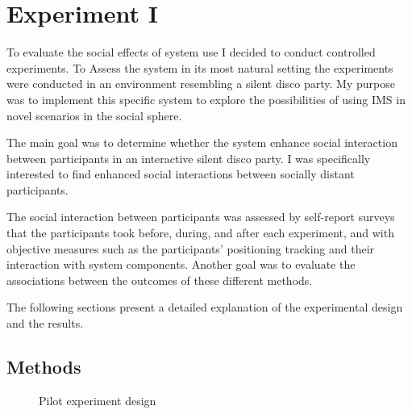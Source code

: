 \documentclass[a4paper,11pt]{article}
\begin{document}
{\section{Experiment I}

To evaluate the social effects of system use I decided to conduct controlled experiments.
To Assess the system in its most natural setting the experiments were conducted in an environment resembling a silent disco party.
My purpose was to implement this specific system to explore the possibilities of using IMS in novel scenarios in the social sphere.

The main goal was to determine whether the system enhance social interaction between participants in an interactive silent disco party.
I was specifically interested to find enhanced social interactions between socially distant participants.

The social interaction between participants was assessed by self-report surveys that the participants took before, during, and after each experiment, and with objective measures such as the participants' positioning tracking and their interaction with system components.
Another goal was to evaluate the associations between the outcomes of these different methods.

The following sections present a detailed explanation of the experimental design and the results.

\subsection{Methods}

\begin{figure}[!htb]
	\centering
	\def\svgwidth{0.95\columnwidth}
  	
	\caption{Pilot experiment design}\label{fig:pilot}
\end{figure}

}
\end{document}

